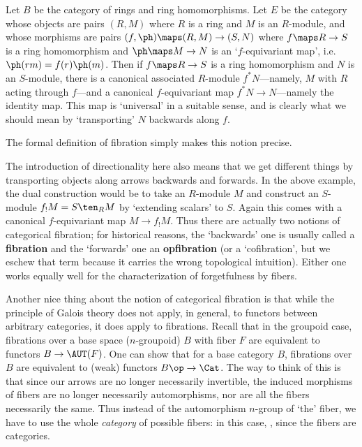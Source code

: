 \documentclass[12pt]{amsart}
\begin{document}
\begin{eg}
  Let $B$ be the category of rings and ring homomorphisms.  Let $E$ be
  the category whose objects are pairs $(R,M)$ where $R$ is a ring and
  $M$ is an $R$-module, and whose morphisms are pairs $(f,\ph)\maps
  (R,M)\to (S,N)$ where $f\maps R\to S$ is a ring homomorphism and
  $\ph\maps M\to N$ is an `$f$-equivariant map', i.e.\
  $\ph(rm)=f(r)\ph(m)$.  Then if $f\maps R\to S$ is a ring
  homomorphism and $N$ is an $S$-module, there is a canonical
  associated $R$-module $f^*N$---namely, $M$ with $R$ acting through
  $f$---and a canonical $f$-equivariant map $f^*N\to N$---namely the
  identity map.  This map is `universal' in a suitable sense, and is
  clearly what we should mean by `transporting' $N$ backwards along
  $f$.
\end{eg}

The formal definition of fibration simply makes this notion precise.

The introduction of directionality here also means
that we get different things by transporting objects along arrows
backwards and forwards.  In the above example, the dual construction
would be to take an $R$-module $M$ and construct an $S$-module $f_!M =
S\ten_R M$ by `extending scalars' to $S$.  Again this comes with a
canonical $f$-equivariant map $M\to f_! M$.  Thus there are actually
two notions of categorical fibration; for historical reasons, the
`backwards' one is usually called a \textbf{fibration} and the
`forwards' one an \textbf{opfibration} (or a `cofibration', but we
eschew that term because it carries the wrong topological intuition).
Either one works equally well for the characterization of
forgetfulness by fibers.

Another nice thing about the notion of categorical fibration is that
while the principle of Galois theory does not apply, in general, to
functors between arbitrary categories, it does apply to fibrations.
Recall that in the groupoid case, fibrations over a base space
($n$-groupoid) $B$ with fiber $F$ are equivalent to functors $B\to
\AUT(F)$.  One can show that for a base category $B$, fibrations over
$B$ are equivalent to (weak) functors $B\op\to\Cat$.  The way to think
of this is that since our arrows are no longer necessarily invertible,
the induced morphisms of fibers are no longer necessarily
automorphisms, nor are all the fibers necessarily the same.  Thus
instead of the automorphism $n$-group of `the' fiber, we have to use
the whole \emph{category} of possible fibers: in this case, \Cat,
since the fibers are categories.
\end{document}
